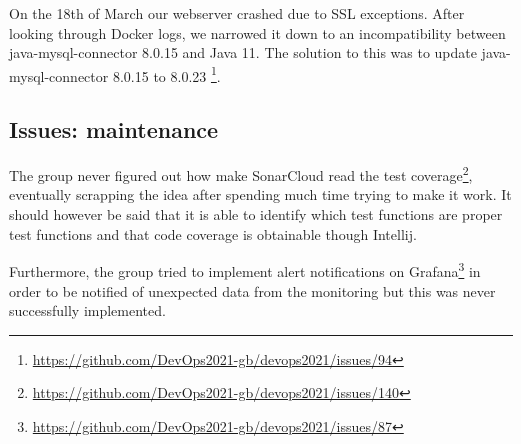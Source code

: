 On the 18th of March our webserver crashed due to SSL exceptions. After looking through Docker logs, we narrowed it down to an incompatibility between java-mysql-connector 8.0.15 and Java 11. The solution to this was to update java-mysql-connector 8.0.15 to 8.0.23 \footnote{\url{https://github.com/DevOps2021-gb/devops2021/issues/94}}.

\subsection{Issues: maintenance}
The group never figured out how make SonarCloud read the test coverage\footnote{\url{https://github.com/DevOps2021-gb/devops2021/issues/140}}, eventually scrapping the idea after spending much time trying to make it work. It should however be said that it is able to identify which test functions are proper test functions and that code coverage is obtainable though Intellij. 

Furthermore, the group tried to implement alert notifications on Grafana\footnote{\url{https://github.com/DevOps2021-gb/devops2021/issues/87}} in order to be notified of unexpected data from the monitoring but this was never successfully implemented.